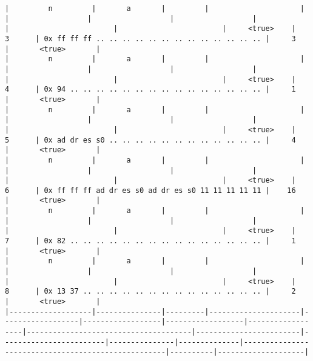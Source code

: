 \documentclass[varwidth=\maxdimen,margin=0.5cm,multi={verbatim}]{standalone}
\begin{document}
\begin{verbatim}
|         n         |       a       |         |                     |                  |                  |                  |                  |                                      |                        |                        |     <true>    |       3      | 0x ff ff ff .. .. .. .. .. .. .. .. .. .. .. .. .. |     3    |       <true>       |
|         n         |       a       |         |                     |                  |                  |                  |                  |                                      |                        |                        |     <true>    |       4      | 0x 94 .. .. .. .. .. .. .. .. .. .. .. .. .. .. .. |     1    |       <true>       |
|         n         |       a       |         |                     |                  |                  |                  |                  |                                      |                        |                        |     <true>    |       5      | 0x ad dr es s0 .. .. .. .. .. .. .. .. .. .. .. .. |     4    |       <true>       |
|         n         |       a       |         |                     |                  |                  |                  |                  |                                      |                        |                        |     <true>    |       6      | 0x ff ff ff ad dr es s0 ad dr es s0 11 11 11 11 11 |    16    |       <true>       |
|         n         |       a       |         |                     |                  |                  |                  |                  |                                      |                        |                        |     <true>    |       7      | 0x 82 .. .. .. .. .. .. .. .. .. .. .. .. .. .. .. |     1    |       <true>       |
|         n         |       a       |         |                     |                  |                  |                  |                  |                                      |                        |                        |     <true>    |       8      | 0x 13 37 .. .. .. .. .. .. .. .. .. .. .. .. .. .. |     2    |       <true>       |
|-------------------|---------------|---------|---------------------|------------------|------------------|------------------|------------------|--------------------------------------|------------------------|------------------------|---------------|--------------|----------------------------------------------------|----------|--------------------|

\end{verbatim}
\end{document}

